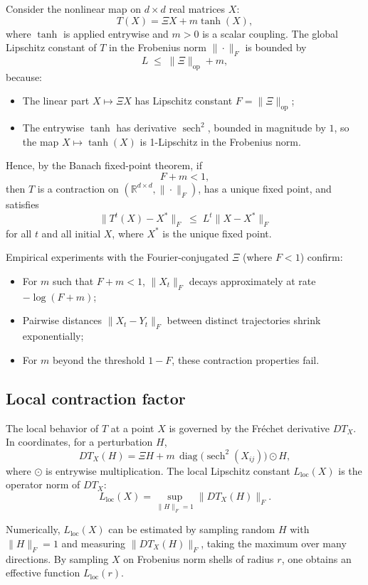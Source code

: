 \documentclass[11pt]{article}
\begin{document}
Consider the nonlinear map on $d\times d$ real matrices $X$:
\[
  T(X) = \Xi X + m \tanh(X),
\]
where $\tanh$ is applied entrywise and $m>0$ is a scalar coupling. The global Lipschitz constant of $T$ in the Frobenius norm $\|\cdot\|_F$ is bounded by
\[
  L \;\leq\; \|\Xi\|_{\mathrm{op}} + m,
\]
because:
\begin{itemize}
  \item The linear part $X\mapsto \Xi X$ has Lipschitz constant $F=\|\Xi\|_{\mathrm{op}}$;
  \item The entrywise $\tanh$ has derivative $\operatorname{sech}^2$, bounded in magnitude by $1$, so the map $X\mapsto \tanh(X)$ is 1-Lipschitz in the Frobenius norm.
\end{itemize}
Hence, by the Banach fixed-point theorem, if
\[
  F + m < 1,
\]
then $T$ is a contraction on $(\mathbb{R}^{d\times d},\|\cdot\|_F)$, has a unique fixed point, and satisfies
\[
  \|T^t(X) - X^*\|_F \;\leq\; L^t \|X - X^*\|_F
\]
for all $t$ and all initial $X$, where $X^*$ is the unique fixed point.

Empirical experiments with the Fourier-conjugated $\Xi$ (where $F<1$) confirm:
\begin{itemize}
  \item For $m$ such that $F+m<1$, $\|X_t\|_F$ decays approximately at rate $-\log(F+m)$;
  \item Pairwise distances $\|X_t - Y_t\|_F$ between distinct trajectories shrink exponentially;
  \item For $m$ beyond the threshold $1-F$, these contraction properties fail.
\end{itemize}

\subsection{Local contraction factor}

The local behavior of $T$ at a point $X$ is governed by the Fr\'echet derivative $DT_X$. In coordinates, for a perturbation $H$,
\[
  DT_X(H) = \Xi H + m\,\operatorname{diag}\!\bigl(\operatorname{sech}^2(X_{ij})\bigr)\odot H,
\]
where $\odot$ is entrywise multiplication. The local Lipschitz constant $L_{\text{loc}}(X)$ is the operator norm of $DT_X$:
\[
  L_{\text{loc}}(X) = \sup_{\|H\|_F=1} \|DT_X(H)\|_F.
\]

Numerically, $L_{\text{loc}}(X)$ can be estimated by sampling random $H$ with $\|H\|_F=1$ and measuring $\|DT_X(H)\|_F$, taking the maximum over many directions. By sampling $X$ on Frobenius norm shells of radius $r$, one obtains an effective function $L_{\text{loc}}(r)$.
\end{document}
